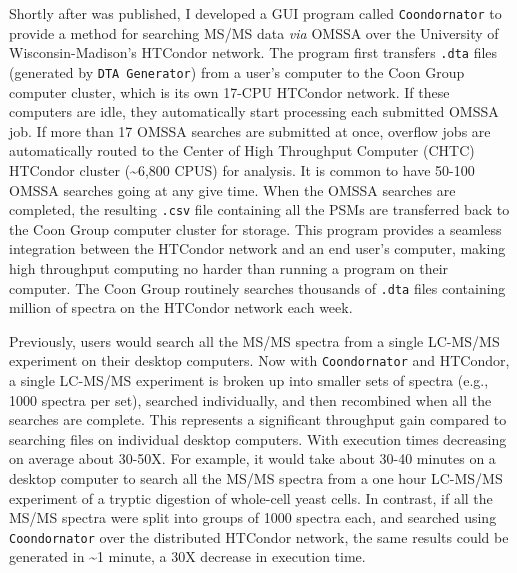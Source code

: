 Shortly after \compass{} was published, I developed a GUI program called \texttt{Coondornator} to provide a method for searching MS/MS data \emph{via} OMSSA over the University of Wisconsin-Madison's HTCondor network. The program first transfers \texttt{.dta} files (generated by \texttt{DTA Generator}) from a user's computer to the Coon Group computer cluster, which is its own 17-CPU HTCondor network. If these computers are idle, they automatically start processing each submitted OMSSA job. If more than 17 OMSSA searches are submitted at once, overflow jobs are automatically routed to the Center of High Throughput Computer (CHTC) HTCondor cluster (\textasciitilde6,800 CPUS) for analysis. It is common to have 50-100 OMSSA searches going at any give time. When the OMSSA searches are completed, the resulting \texttt{.csv} file containing all the PSMs are transferred back to the Coon Group computer cluster for storage. This program provides a seamless integration between the HTCondor network and an end user's computer, making high throughput computing no harder than running a program on their computer. The Coon Group routinely searches thousands of \texttt{.dta} files containing million of spectra on the HTCondor network each week.

Previously, users would search all the MS/MS spectra from a single LC-MS/MS experiment on their desktop computers. Now with \texttt{Coondornator} and HTCondor, a single LC-MS/MS experiment is broken up into smaller sets of spectra (e.g., 1000 spectra per set), searched individually, and then recombined when all the searches are complete. This represents a significant throughput gain compared to searching files on individual desktop computers. With execution times decreasing on average about 30-50X. For example, it would take about 30-40 minutes on a desktop computer to search all the MS/MS spectra from a one hour LC-MS/MS experiment of a tryptic digestion of whole-cell yeast cells. In contrast, if all the MS/MS spectra were split into groups of 1000 spectra each, and searched using \texttt{Coondornator} over the distributed HTCondor network, the same results could be generated in \textasciitilde1 minute, a 30X decrease in execution time.

